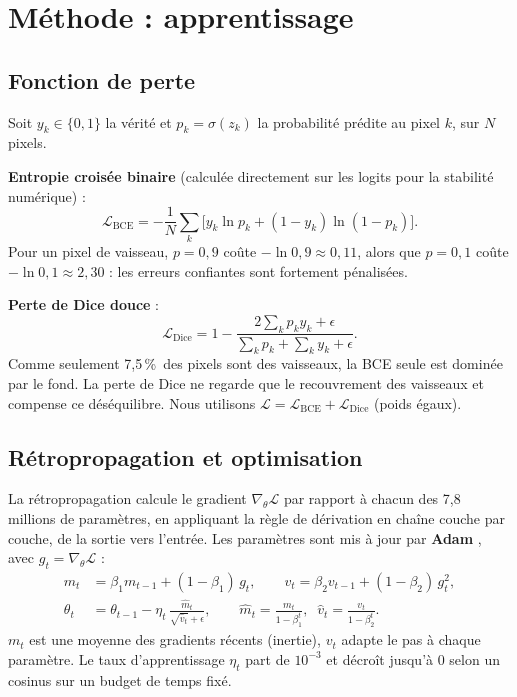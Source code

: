 \documentclass[11pt,a4paper]{article}
\newcommand{\pct}{\,\%}
\begin{document}
\section{Méthode : apprentissage}

\subsection{Fonction de perte}
Soit $y_k\in\{0,1\}$ la vérité et $p_k=\sigma(z_k)$ la probabilité prédite au pixel $k$, sur $N$ pixels.

\textbf{Entropie croisée binaire} (calculée directement sur les logits pour la stabilité numérique) :
\begin{equation}
\mathcal{L}_{\text{BCE}} = -\frac{1}{N}\sum_{k}\Big[y_k\ln p_k + (1-y_k)\ln(1-p_k)\Big].
\end{equation}
Pour un pixel de vaisseau, $p=0{,}9$ coûte $-\ln 0{,}9\approx0{,}11$, alors que $p=0{,}1$ coûte $-\ln0{,}1\approx2{,}30$ : les erreurs confiantes sont fortement pénalisées.

\textbf{Perte de Dice douce} \cite{vnet} :
\begin{equation}
\mathcal{L}_{\text{Dice}} = 1-\frac{2\sum_k p_k y_k + \epsilon}{\sum_k p_k + \sum_k y_k + \epsilon}.
\end{equation}
Comme seulement 7,5\pct\ des pixels sont des vaisseaux, la BCE seule est dominée par le fond. La perte de Dice ne regarde que le recouvrement des vaisseaux et compense ce déséquilibre. Nous utilisons $\mathcal{L}=\mathcal{L}_{\text{BCE}}+\mathcal{L}_{\text{Dice}}$ (poids égaux).

\subsection{Rétropropagation et optimisation}
La rétropropagation calcule le gradient $\nabla_\theta\mathcal{L}$ par rapport à chacun des 7,8 millions de paramètres, en appliquant la règle de dérivation en chaîne couche par couche, de la sortie vers l'entrée. Les paramètres sont mis à jour par \textbf{Adam} \cite{adam}, avec $g_t=\nabla_\theta\mathcal{L}$ :
\begin{align}
m_t &= \beta_1 m_{t-1} + (1-\beta_1)\,g_t, \qquad v_t = \beta_2 v_{t-1} + (1-\beta_2)\,g_t^2,\\
\theta_t &= \theta_{t-1} - \eta_t\,\frac{\hat m_t}{\sqrt{\hat v_t}+\epsilon}, \qquad \hat m_t=\frac{m_t}{1-\beta_1^t},\;\; \hat v_t=\frac{v_t}{1-\beta_2^t}.
\end{align}
$m_t$ est une moyenne des gradients récents (inertie), $v_t$ adapte le pas à chaque paramètre. Le taux d'apprentissage $\eta_t$ part de $10^{-3}$ et décroît jusqu'à 0 selon un cosinus sur un budget de temps fixé.
\end{document}
